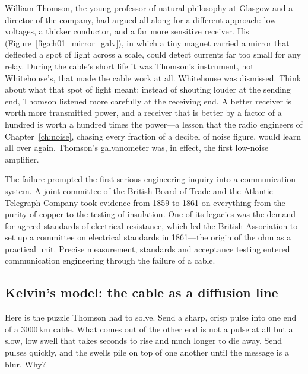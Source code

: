 
William Thomson, the young professor of natural philosophy at Glasgow and a director of the company,
had argued all along for a different approach: low voltages, a thicker conductor, and a far more
sensitive receiver. His  (Figure~\ref{fig:ch01_mirror_galv}), in which a
tiny magnet carried a mirror that deflected a spot of light across a scale, could detect currents far
too small for any relay. During the cable's short life it was Thomson's instrument, not Whitehouse's,
that made the cable work at all. Whitehouse was dismissed. Think about what that spot of light meant:
instead of shouting louder at the sending end, Thomson listened more carefully at the receiving end.
A better receiver is worth more transmitted power, and a receiver that is better by a factor of
a hundred is worth a hundred times the power---a lesson that the radio engineers of
Chapter~\ref{ch:noise}, chasing every fraction of a decibel of noise figure, would learn all over
again. Thomson's galvanometer was, in effect, the first low-noise amplifier.


The failure prompted the first serious engineering inquiry into a communication system. A joint
committee of the British Board of Trade and the Atlantic Telegraph Company took evidence from 1859 to
1861 on everything from the purity of copper to the testing of insulation. One of its legacies was
the demand for agreed standards of electrical resistance, which led the British Association to set up
a committee on electrical standards in 1861---the origin of the ohm as a practical unit. Precise
measurement, standards and acceptance testing entered communication engineering through the failure
of a cable.

\subsection{Kelvin's model: the cable as a diffusion line}

Here is the puzzle Thomson had to solve. Send a sharp, crisp pulse into one end of a 3000\,km cable.
What comes out of the other end is not a pulse at all but a slow, low swell that takes seconds to rise
and much longer to die away. Send pulses quickly, and the swells pile on top of one another until the
message is a blur. Why?

